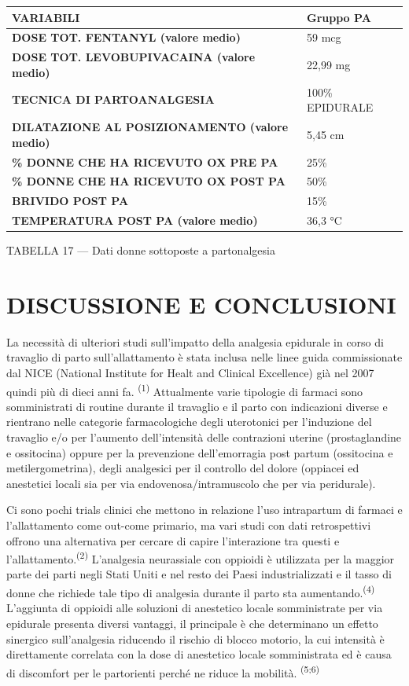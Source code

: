 \documentclass[]{article}
\begin{document}
\begin{longtable}[]{@{}ll@{}}
\toprule
\textbf{VARIABILI} & \textbf{Gruppo PA}\tabularnewline
\midrule
\endhead
\textbf{DOSE TOT. FENTANYL (valore medio)} & 59 mcg\tabularnewline
\textbf{DOSE TOT. LEVOBUPIVACAINA (valore medio)} & 22,99
mg\tabularnewline
\textbf{TECNICA DI PARTOANALGESIA} & 100\% EPIDURALE\tabularnewline
\textbf{DILATAZIONE AL POSIZIONAMENTO (valore medio)} & 5,45
cm\tabularnewline
\textbf{\% DONNE CHE HA RICEVUTO OX PRE PA} & 25\%\tabularnewline
\textbf{\% DONNE CHE HA RICEVUTO OX POST PA} & 50\%\tabularnewline
\textbf{BRIVIDO POST PA} & 15\%\tabularnewline
\textbf{TEMPERATURA POST PA (valore medio)} & 36,3 °C\tabularnewline
\bottomrule
\end{longtable}

TABELLA 17 --- Dati donne sottoposte a partonalgesia

\hypertarget{discussione-e-conclusioni}{%
\section{DISCUSSIONE E CONCLUSIONI}\label{discussione-e-conclusioni}}

La necessità di ulteriori studi sull'impatto della analgesia epidurale
in corso di travaglio di parto sull'allattamento è stata inclusa nelle
linee guida commissionate dal NICE (National Institute for Healt and
Clinical Excellence) già nel 2007 quindi più di dieci anni fa.
\textsuperscript{(1)} Attualmente varie tipologie di farmaci sono
somministrati di routine durante il travaglio e il parto con indicazioni
diverse e rientrano nelle categorie farmacologiche degli uterotonici per
l'induzione del travaglio e/o per l'aumento dell'intensità delle
contrazioni uterine (prostaglandine e ossitocina) oppure per la
prevenzione dell'emorragia post partum (ossitocina e metilergometrina),
degli analgesici per il controllo del dolore (oppiacei ed anestetici
locali sia per via endovenosa/intramuscolo che per via peridurale).

Ci sono pochi trials clinici che mettono in relazione l'uso intrapartum
di farmaci e l'allattamento come out-come primario, ma vari studi con
dati retrospettivi offrono una alternativa per cercare di capire
l'interazione tra questi e l'allattamento.\textsuperscript{(2)}
L'analgesia neurassiale con oppioidi è utilizzata per la maggior parte
dei parti negli Stati Uniti e nel resto dei Paesi industrializzati e il
tasso di donne che richiede tale tipo di analgesia durante il parto sta
aumentando.\textsuperscript{(4)} L'aggiunta di oppioidi alle soluzioni
di anestetico locale somministrate per via epidurale presenta diversi
vantaggi, il principale è che determinano un effetto sinergico
sull'analgesia riducendo il rischio di blocco motorio, la cui intensità
è direttamente correlata con la dose di anestetico locale somministrata
ed è causa di discomfort per le partorienti perché ne riduce la
mobilità. \textsuperscript{(5;6) }
\end{document}
